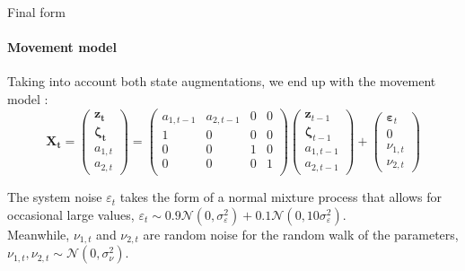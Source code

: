 \documentclass[dvipsnames, handout]{beamer}
\begin{document}
\begin{frame}{Final form}
\framesubtitle{Movement model}

Taking into account both state augmentations, we end up with the movement model :
\begin{equation}
\label{eqn:markov process}
    \mathbf{X_t} =
    \begin{pmatrix}
    \mathbf{z_t}\\\mathbf{\zeta_t}\\ a_{1,t}\\ a_{2,t}
    \end{pmatrix}
    =
    \begin{pmatrix}
    a_{1,t-1}& a_{2,t-1} & 0 & 0\\
    1 & 0 & 0 & 0\\
    0 & 0 & 1 & 0\\
    0 & 0 & 0 & 1\\

    \end{pmatrix}
    \begin{pmatrix}
    \mathbf{z}_{t-1}\\\mathbf{\zeta}_{t-1}\\ a_{1, t-1} \\ a_{2,t-1}
    \end{pmatrix}
    +
    \begin{pmatrix}
    \mathbf{\varepsilon}_t \\ 0 \\ \nu_{1,t} \\\nu_{2,t}
    \end{pmatrix}
\end{equation}

 The system noise $\varepsilon_t$ takes the form of a normal mixture process that allows for occasional large values, $\varepsilon_t \sim 0.9 \mathcal{N}({0},{\sigma_{\varepsilon}^2}) + 0.1 \mathcal{N}({0},{10\sigma_{\varepsilon}^2})$.
 \newline
\\
 Meanwhile, $\nu_{1,t}$ and $\nu_{2,t}$ are random noise for the random walk of the parameters, $\nu_{1,t}, \nu_{2,t} \sim \mathcal{N}({0},{\sigma_{\nu}^2})$.
\end{frame}
\end{document}

